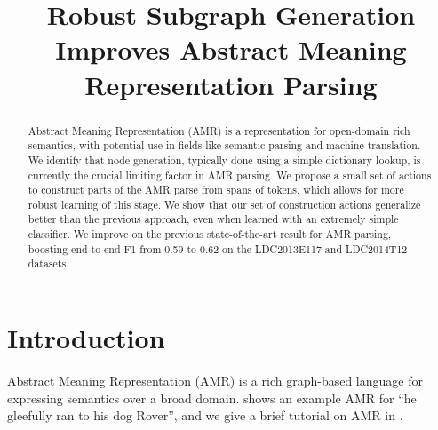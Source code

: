 \documentclass[11pt]{article}
\title{Robust Subgraph Generation Improves Abstract Meaning Representation Parsing}
\author{
}
\date{}
\begin{document}
\maketitle
\begin{abstract}


Abstract Meaning Representation (AMR) is a representation for open-domain rich semantics, with potential use in fields like semantic parsing
  and machine translation.
We identify that node generation, typically done using a simple
  dictionary lookup, is currently the crucial limiting factor in AMR parsing.
We propose a small set of actions to construct parts of the AMR parse from spans of tokens, which allows for more robust learning of this stage.
We show that our set of construction actions generalize better than the previous approach, even when learned with an extremely simple classifier.
We improve on the previous state-of-the-art result for AMR parsing, boosting end-to-end F1 from 0.59 to 0.62 on the LDC2013E117 and LDC2014T12 datasets.

\end{abstract}

\section{Introduction}


Abstract Meaning Representation (AMR) \cite{2013banarescu-amr} is a rich graph-based language for expressing semantics over a broad domain.
 shows an example AMR for ``he gleefully ran to his dog Rover'', and we give a brief tutorial on AMR in .
\end{document}
